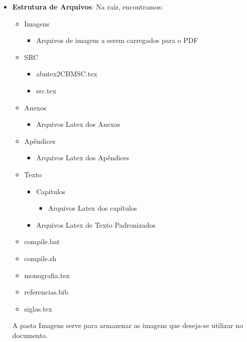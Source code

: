\begin{itemize}
    \item \textbf{Estrutura de Arquivos}: Na raíz, encontramos: 
    \begin{itemize}
        \item Imagens
        \begin{itemize}
            \item Arquivos de imagem a serem carregados para o PDF
        \end{itemize}
        \item SRC
            \begin{itemize}
                \item abntex2CBMSC.tex
                \item src.tex
            \end{itemize}
        \item Anexos
        \begin{itemize}
            \item Arquivos Latex dos Anexos
        \end{itemize}
        \item Apêndices
        \begin{itemize}
            \item Arquivos Latex dos Apêndices
        \end{itemize}
        \item Texto
            \begin{itemize}
                \item Capitulos
                    \begin{itemize}
                        \item Arquivos Latex dos capítulos
                    \end{itemize}
                \item Arquivos Latex de Texto Padronizados
            \end{itemize}
        \item compile.bat
        \item compile.sh
        \item monografia.tex
        \item referencias.bib
        \item siglas.tex
    \end{itemize}

     \hspace{0.5cm} A pasta Imagens serve para armazenar as imagens que deseja-se utilizar no documento.


\end{itemize}
